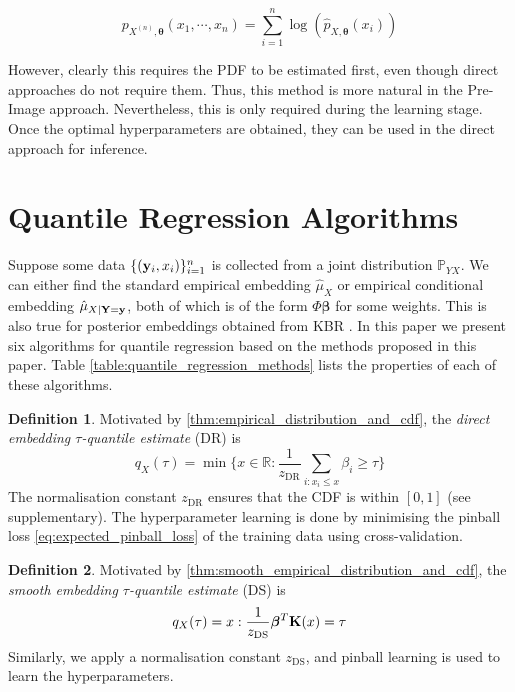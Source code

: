 \documentclass[twoside]{article} \usepackage{aistats2017}
\theoremstyle{definition}
\newtheorem{definition}{Definition}[section]
\theoremstyle{theorem}
\newcommand{\rv}[1]{{#1}}
\begin{document}
	\begin{equation}
		p_{\rv{X}^{(n)}, \bm{\theta}}(x_{1}, \cdots, x_{n}) = \sum_{i = 1}^{n} \log(\hat{p}_{\rv{X}, \bm{\theta}}(x_{i}))
	\label{eq:lml}
	\end{equation}
	
	However, clearly this requires the PDF to be estimated first, even though direct approaches do not require them. Thus, this method is more natural in the Pre-Image approach. Nevertheless, this is only required during the learning stage. Once the optimal hyperparameters are obtained, they can be used in the direct approach for inference.
	
\section{Quantile Regression Algorithms}
\label{sec:quantile_regression_algorithms}
	
	Suppose some data $\{(\mathbf{y}_{i}, x_{i})\}_{i = 1}^{n}$ is collected from a joint distribution $\mathbb{P}_{\rv{Y} \rv{X}}$. We can either find the standard empirical embedding $\hat{\mu}_{\rv{X}}$ or empirical conditional embedding $\hat{\mu}_{\rv{X} | \bvec{\rv{Y}} = \bvec{y}}$, both of which is of the form $\Phi \bm{\beta}$ for some weights. This is also true for posterior embeddings obtained from KBR \citep{fukumizu2013kernel}. In this paper we present six algorithms for quantile regression based on the methods proposed in this paper. Table \ref{table:quantile_regression_methods} lists the properties of each of these algorithms.

	\theoremstyle{definition}
	\begin{definition}
		Motivated by \cref{thm:empirical_distribution_and_cdf}, the \textit{direct embedding $\tau$-quantile estimate} (DR) is
		\begin{equation}
			q_{\rv{X}}(\tau) = \min\{x \in \mathbb{R} : \frac{1}{z_{\mathrm{DR}}} \sum_{i : x_{i} \leq x} \beta_{i} \geq \tau\}
		\end{equation}	
		The normalisation constant $z_{\mathrm{DR}}$ ensures that the CDF is within $[0, 1]$ (see supplementary). The hyperparameter learning is done by minimising the pinball loss \eqref{eq:expected_pinball_loss} of the training data using cross-validation.
	\end{definition}
	
	\theoremstyle{definition}
	\begin{definition}
		Motivated by \cref{thm:smooth_empirical_distribution_and_cdf}, the \textit{smooth embedding $\tau$-quantile estimate} (DS) is
		\begin{equation}
			q_{\rv{X}}(\tau) = x : \frac{1}{z_{\mathrm{DS}}} \bm{\beta}^{T} \bvec{K}(x) = \tau
		\end{equation}	
		Similarly, we apply a normalisation constant $z_{\mathrm{DS}}$, and pinball learning is used to learn the hyperparameters.
	\end{definition}
	
\end{document}
